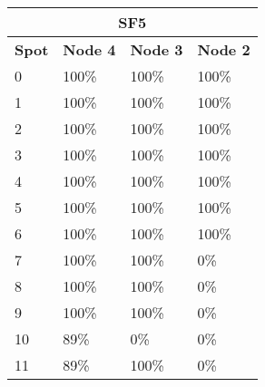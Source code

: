 \begin{tabular}{|l|l|l|l|}
\multicolumn{4}{c}{\textbf{SF5}} \\ \hline 
\textbf{Spot} & \textbf{Node 4} & \textbf{Node 3} & \textbf{Node 2} \\ \hline
0 & 100\% & 100\% & 100\% \\ \hline
1 & 100\% & 100\% & 100\% \\ \hline
2 & 100\% & 100\% & 100\% \\ \hline
3 & 100\% & 100\% & 100\% \\ \hline
4 & 100\% & 100\% & 100\% \\ \hline
5 & 100\% & 100\% & 100\% \\ \hline
6 & 100\% & 100\% & 100\% \\ \hline
7 & 100\% & 100\% & 0\% \\ \hline
8 & 100\% & 100\% & 0\% \\ \hline
9 & 100\% & 100\% & 0\% \\ \hline
10 & 89\% & 0\% & 0\% \\ \hline
11 & 89\% & 100\% & 0\% \\ \hline
\end{tabular}
